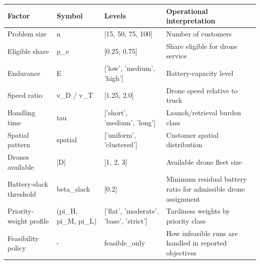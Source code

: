 \begin{tabular}{llll}
\toprule
Factor & Symbol & Levels & Operational interpretation \\
\midrule
Problem size & n & [15, 50, 75, 100] & Number of customers \\
Eligible share & p_e & [0.25, 0.75] & Share eligible for drone service \\
Endurance & E & ['low', 'medium', 'high'] & Battery-capacity level \\
Speed ratio & v_D / v_T & [1.25, 2.0] & Drone speed relative to truck \\
Handling time & tau & ['short', 'medium', 'long'] & Launch/retrieval burden class \\
Spatial pattern & spatial & ['uniform', 'clustered'] & Customer spatial distribution \\
Drones available & |D| & [1, 2, 3] & Available drone fleet size \\
Battery-slack threshold & beta_slack & [0.2] & Minimum residual battery ratio for admissible drone assignment \\
Priority-weight profile & (pi_H, pi_M, pi_L) & ['flat', 'moderate', 'base', 'strict'] & Tardiness weights by priority class \\
Feasibility policy & - & feasible_only & How infeasible runs are handled in reported objectives \\
\bottomrule
\end{tabular}
